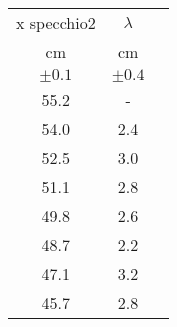 \begin{table}[H]
\begin{center}
\begin{tabular}{|c|c|c|}
\hline
    x specchio2	&	$\lambda$	\\
    cm	&	cm	\\
    $\pm 0.1 $	&	$\pm 0.4$	\\ \hline
    55.2	&	-	\\
    54.0	&	2.4	\\
    52.5	&	3.0	\\
    51.1	&	2.8	\\
    49.8	&	2.6	\\
    48.7	&	2.2	\\
    47.1	&	3.2	\\
    45.7	&	2.8	\\ \hline
\end{tabular}
\end{center}
\end{table}